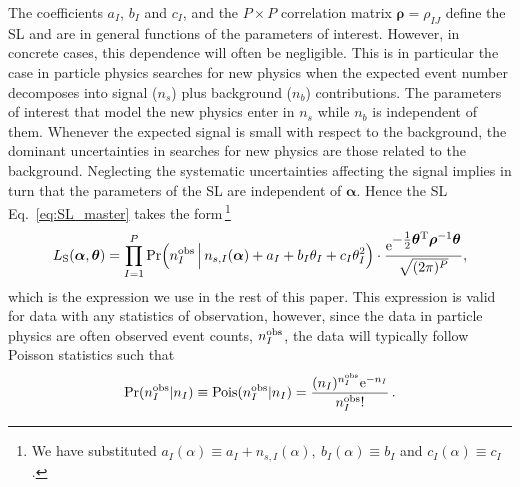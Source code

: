 \documentclass[11pt]{article}
\newcommand{\be}{\begin{equation}}
\newcommand{\ee}{\end{equation}}
\begin{document}
The coefficients $a_I$, $b_I$ and $c_I$, and the $P\times P$ correlation matrix $\bm{\rho}=\rho_{IJ}$ define the SL and are in general functions of the parameters of interest. However, in concrete cases, this dependence will often be negligible. This is in particular the case in particle physics searches for new physics when the expected event number decomposes into signal ($n_s$) plus background ($n_b$) contributions. The parameters of interest that model the new physics enter in $n_s$ while $n_b$ is independent of them.  Whenever the expected signal is small with respect to the background, the dominant uncertainties in searches for new physics are those related to the background.
Neglecting the systematic uncertainties affecting the signal implies in turn that the parameters of the SL are independent of $\bm \alpha$. Hence the SL Eq.~\eqref{eq:SL_master} takes the form\,\footnote{We have substituted
$a_I(\alpha) \equiv a_I+n_{s,I}(\alpha),~b_I(\alpha) \equiv b_I$ and $c_I(\alpha)\equiv c_I$.}
\begin{equation}
 L_{\rm{S}}(\bm{\alpha},\bm{\theta})=
\prod_{I=1}^P \mathrm{Pr}\Big( n^{\rm obs}_I \, \Big| \, n_{s,I}(\bm{\alpha})+a_I+ b_I\theta_I+c_I\theta_I^2  \Big) \cdot
\frac{ \mathrm{e}^{ \textstyle-\frac{1}{2}\bm{\theta}^\mathrm{T} \bm{\rho}^{-1} \bm{\theta} }}{\sqrt{(2\pi)^P}},
\label{eq:SL_LHC}
\end{equation}
which is the expression we use in the rest of this paper. This expression is valid for data with any statistics of observation, however, since the data in particle physics are often observed event counts, $n_{I}^{\rm{obs}}$, the data will typically follow Poisson statistics such that
\be
\textrm{Pr}(n^{\rm obs}_{I}|n_{I})\equiv \textrm{Pois}({n}^{\rm{obs}}_{I}|n_{I}) = \dfrac{(n_{I})^{{n}^{\rm{obs}}_{I}} \mathrm{e}^{-n_{I}}}{{n}^{\rm{obs}}_{I}!} \, .
\ee
\end{document}
